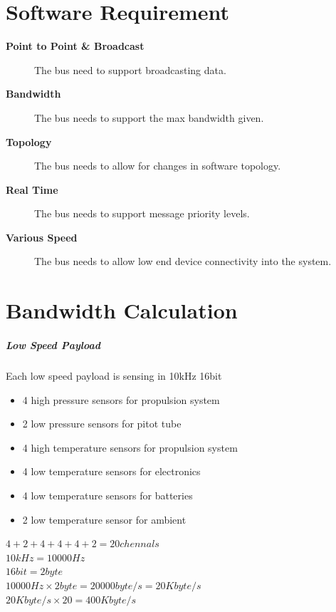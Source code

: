 \documentclass[12pt,article]{memoir}
\begin{document}
\section{Software Requirement}
\begin{description}
	\item[\textbf{Point to Point \& Broadcast}]The bus need to support broadcasting data.
	\item[\textbf{Bandwidth}]The bus needs to support the max bandwidth given.
	\item[\textbf{Topology}]The bus needs to allow for changes in software topology.
	\item[\textbf{Real Time}]The bus needs to support message priority levels.
	\item[\textbf{Various Speed}]The bus needs to allow low end device connectivity into the system.
\end{description}

\section{Bandwidth Calculation}

\subparagraph{Low Speed Payload}
Each low speed payload is sensing in 10kHz 16bit
\begin{itemize}
\item 4 high pressure sensors for propulsion system
\item 2 low pressure sensors for pitot tube
\item 4 high temperature sensors for propulsion system
\item 4 low temperature sensors for electronics
\item 4 low temperature sensors for batteries
\item 2 low temperature sensor for ambient
\end{itemize}
\begin{center}
$4+2+4+4+4+2=20 chennals$\\
$10kHz=10000Hz$\\
$16bit=2byte$\\
$10000Hz\times2byte=20000byte/s=20Kbyte/s$\\
$20Kbyte/s\times20=400Kbyte/s$
\end{center}
\end{document}
